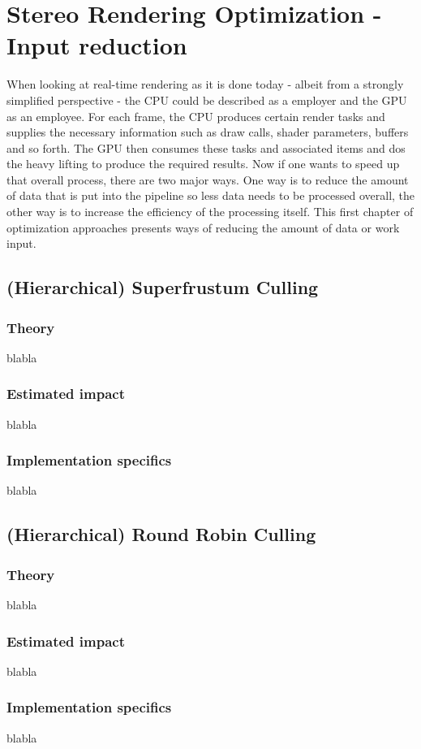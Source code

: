
\chapter{Stereo Rendering Optimization - Input reduction}
When looking at real-time rendering as it is done today - albeit from a strongly simplified perspective - the CPU could be described as a employer and the GPU as an employee. For each frame, the CPU produces certain render tasks and supplies the necessary information such as draw calls, shader parameters, buffers and so forth. The GPU then consumes these tasks and associated items and dos the heavy lifting to produce the required results. 
Now if one wants to speed up that overall process, there are two major ways. One way is to reduce the amount of data that is put into the pipeline so less data needs to be processed overall, the other way is to increase the efficiency of the processing itself.  
This first chapter of optimization approaches presents ways of reducing the amount of data or work input. 

\section{(Hierarchical) Superfrustum Culling}
\subsection{Theory}
blabla
\subsection{Estimated impact}
blabla
\subsection{Implementation specifics}
blabla

\section{(Hierarchical) Round Robin Culling}
\subsection{Theory}
blabla
\subsection{Estimated impact}
blabla
\subsection{Implementation specifics}
blabla